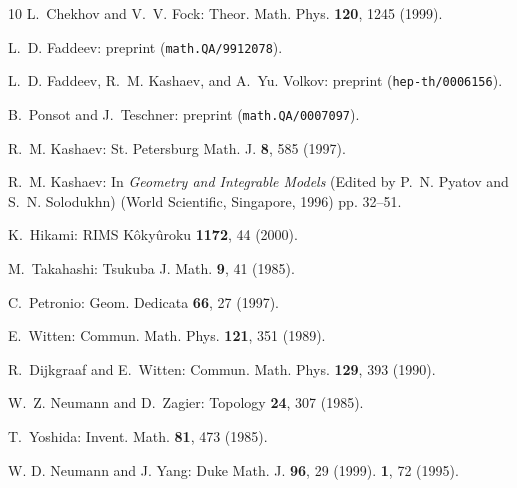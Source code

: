 \documentclass[12pt]{article}
\numberwithin{equation}{section}
\begin{document}
\begin{thebibliography}{10}
  L.~Chekhov and V.~V. Fock: Theor. Math. Phys. \textbf{120}, 1245 (1999).

  L.~D. Faddeev: 
  preprint
  (\texttt{math.QA/9912078}).

  L.~D. Faddeev, R.~M. Kashaev, and A.~Yu. Volkov:
  preprint
  (\texttt{hep-th/0006156}).

  B.~Ponsot and J.~Teschner:
  preprint
  (\texttt{math.QA/0007097}).

  R.~M. Kashaev: St. Petersburg Math. J. \textbf{8}, 585 (1997).

  R.~M. Kashaev: In \emph{Geometry and Integrable Models} (Edited by
  P.~N. Pyatov
  and S.~N. Solodukhn) (World Scientific, Singapore, 1996)  pp. 32--51.

  K.~Hikami: RIMS K{\^o}ky{\^u}roku \textbf{1172}, 44 (2000).

  M.~Takahashi: Tsukuba J. Math. \textbf{9}, 41 (1985).

  C.~Petronio: Geom. Dedicata \textbf{66}, 27 (1997).

  E.~Witten: Commun. Math. Phys. \textbf{121}, 351 (1989).

  R.~Dijkgraaf and E.~Witten: Commun. Math. Phys. \textbf{129}, 393
  (1990).
  

  W.~Z. Neumann and D.~Zagier: Topology \textbf{24}, 307 (1985).

  T.~Yoshida: Invent. Math. \textbf{81}, 473 (1985).


W. D. Neumann and J. Yang:
Duke Math. J. \textbf{96}, 29 (1999).
\textbf{1}, 72 (1995).

\end{thebibliography}
\end{document}
